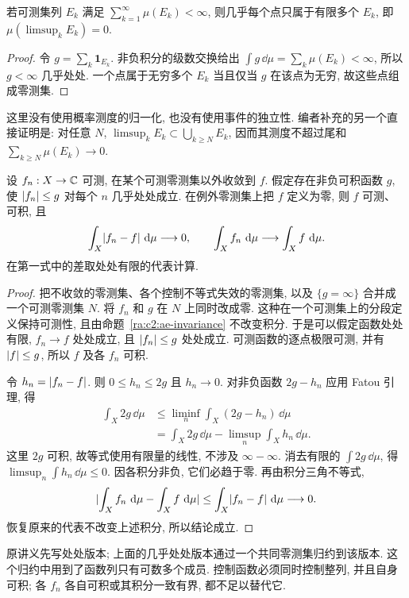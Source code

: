 \begin{theorem}\label{ra:c2:bc}
若可测集列 $E_k$ 满足 $\sum_{k=1}^{\infty}\mu(E_k)<\infty$, 则几乎每个点只属于有限多个 $E_k$, 即 $\mu(\limsup_k E_k)=0$.
\end{theorem}
\begin{proof}
令 $g=\sum_k\mathbf1_{E_k}$. 非负积分的级数交换给出 $\int g\,\dd\mu=\sum_k\mu(E_k)<\infty$, 所以 $g<\infty$ 几乎处处. 一个点属于无穷多个 $E_k$ 当且仅当 $g$ 在该点为无穷, 故这些点组成零测集.
\end{proof}
这里没有使用概率测度的归一化, 也没有使用事件的独立性. 编者补充的另一个直接证明是: 对任意 $N$, $\limsup_k E_k\subset\bigcup_{k\ge N}E_k$, 因而其测度不超过尾和 $\sum_{k\ge N}\mu(E_k)\to0$.

\begin{theorem}[主导收敛定理]\label{ra:c2:dct}
设 $f_n:X\to\mathbb C$ 可测, 在某个可测零测集以外收敛到 $f$. 假定存在非负可积函数 $g$, 使 $\lvert f_n\rvert\le g$ 对每个 $n$ 几乎处处成立. 在例外零测集上把 $f$ 定义为零, 则 $f$ 可测、可积, 且
\[
 \int_X\lvert f_n-f\rvert\,\,\mathrm d\mu\longrightarrow0,
 \qquad \int_Xf_n\,\,\mathrm d\mu\longrightarrow\int_Xf\,\,\mathrm d\mu.
\]
在第一式中的差取处处有限的代表计算.
\end{theorem}
\begin{proof}
把不收敛的零测集、各个控制不等式失效的零测集, 以及 $\{g=\infty\}$ 合并成一个可测零测集 $N$. 将 $f_n$ 和 $g$ 在 $N$ 上同时改成零. 这种在一个可测集上的分段定义保持可测性, 且由命题~\ref{ra:c2:ae-invariance} 不改变积分. 于是可以假定函数处处有限, $f_n\to f$ 处处成立, 且 $\lvert f_n\rvert\le g$ 处处成立. 可测函数的逐点极限可测, 并有 $\lvert f\rvert\le g$, 所以 $f$ 及各 $f_n$ 可积.

令 $h_n=\lvert f_n-f\rvert$. 则 $0\le h_n\le2g$ 且 $h_n\to0$. 对非负函数 $2g-h_n$ 应用 Fatou 引理, 得
\begin{align*}
 \int_X2g\,\dd\mu
 &\le\liminf_n\int_X(2g-h_n)\,\dd\mu\\
 &=\int_X2g\,\dd\mu-\limsup_n\int_Xh_n\,\dd\mu.
\end{align*}
这里 $2g$ 可积, 故等式使用有限量的线性, 不涉及 $\infty-\infty$. 消去有限的 $\int2g\,\dd\mu$, 得 $\limsup_n\int h_n\,\dd\mu\le0$. 因各积分非负, 它们必趋于零. 再由积分三角不等式,
\[
 \lvert \int_Xf_n\,\,\mathrm d\mu-\int_Xf\,\,\mathrm d\mu\rvert
 \le\int_X\lvert f_n-f\rvert\,\,\mathrm d\mu\longrightarrow0.
\]
恢复原来的代表不改变上述积分, 所以结论成立.
\end{proof}
原讲义先写处处版本; 上面的几乎处处版本通过一个共同零测集归约到该版本. 这个归约中用到了函数列只有可数多个成员. 控制函数必须同时控制整列, 并且自身可积; 各 $f_n$ 各自可积或其积分一致有界, 都不足以替代它.

